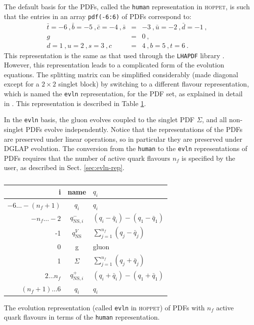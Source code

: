 \documentclass[12pt]{article}
\newcommand{\bea}{\begin{eqnarray}}
\newcommand{\eea}{\end{eqnarray}}
\newcommand{\nn}{\nonumber}
\newcommand{\hoppet}{\textsc{hoppet}\xspace}
\newcommand{\ttt}[1]{\texttt{#1}}
\begin{document}
The default basis for the PDFs, called the \ttt{human} 
representation in \hoppet, is such that 
 the entries in an array
\ttt{pdf(-6:6)} of PDFs correspond to:
\bea 
\bar t={-6} \ ,  \bar b={-5} \ ,  \bar c={-4}
\ , \nn   \bar s&=&{-3} \ , \nn  \bar u={-2} \ , \nn
 \bar d={-1} \ , \\  g&=&{0} \ , \\ \nn   d={1} \ , \nn  u={2} 
\ , \nn  
s={3} \ , \nn   c&=&{4} \ , \nn b={5} \ , \nn  t={6} \ . \nn 
\eea
 This representation is the
same as that used through the \ttt{LHAPDF} library \cite{LHAPDF}. 
However, this representation leads
to a complicated form of the evolution equations.
The splitting matrix can be simplified considerably (made diagonal
except for a $2\times2$ singlet block) by switching to a different
flavour representation, which is named
the \ttt{evln} representation, for the PDF set, as explained in detail in
\cite{vanNeerven:1999ca,vanNeerven:2000uj}. This representation
is described in Table \ref{eq:diag_split}.

In the {\tt evln} basis, 
the gluon evolves coupled to the singlet  PDF $\Sigma$,
and all non-singlet PDFs evolve independently.
Notice that the representations of the PDFs
are preserved under linear operations, so in particular
they are preserved under DGLAP evolution.
The conversion from the \ttt{human} to the \ttt{evln}
representations of PDFs requires that the number of
active quark flavours $n_f$ is specified by the user, as described in
Sect. \ref{sec:evln-rep}.

\begin{table}
\begin{center}
\begin{tabular}{|r | c | l |}
\hline
     i & \mbox{name} & $q_i$ \\ \hline
     $ -6\ldots-(n_f+1)$ & $q_i$ & $q_i$\\
     $-n_f\ldots -2$ & $q_{\mathrm{NS},i}^{-}$ & 
$(q_i -  {\bar q}_i) - (q_1 - {\bar q}_1)$\\
      -1           & $q_{\mathrm{NS}}^{V}$ & 
$\sum_{j=1}^{n_f} (q_j -  {\bar q}_j)$\\
       0           & g & \textrm{gluon} \\
       1           & $\Sigma$ & $\sum_{j=1}^{n_f} (q_j +  {\bar q}_j)$\\
     $2\ldots n_f$ & $q_{\mathrm{NS},i}^{+}$ &
$ (q_i +  {\bar q}_i) - (q_1 + {\bar q}_1)$\\
      $(n_f+1)\ldots6$ & $q_i$ & $q_i$ \\
\hline
\end{tabular}
\caption{}{\label{eq:diag_split} The evolution representation 
(called \ttt{evln} in \hoppet)
of PDFs with $n_f$ active quark flavours
in terms of the \ttt{human} representation.}  
\end{center}
\end{table}
\end{document}
